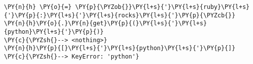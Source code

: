 \begin{Verbatim}[commandchars=\\\{\}]
\PY{n}{h} \PY{o}{=} \PY{p}{\PYZob{}}\PY{l+s}{'}\PY{l+s}{ruby}\PY{l+s}{'}\PY{p}{:}\PY{l+s}{'}\PY{l+s}{rocks}\PY{l+s}{'}\PY{p}{\PYZcb{}}
\PY{n}{h}\PY{o}{.}\PY{n}{get}\PY{p}{(}\PY{l+s}{'}\PY{l+s}{python}\PY{l+s}{'}\PY{p}{)}
\PY{c}{\PYZsh{}--> <nothing>}
\PY{n}{h}\PY{p}{[}\PY{l+s}{'}\PY{l+s}{python}\PY{l+s}{'}\PY{p}{]}
\PY{c}{\PYZsh{}--> KeyError: 'python'}
\end{Verbatim}
